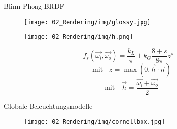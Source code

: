\begin{frame}{\Huge{Blinn-Phong BRDF}}
		
		\begin{figure}
				\centering
				\begin{minipage}{.4\paperwidth}
					\centering
					\texttt{[image: 02\_Rendering/img/glossy.jpg]}
				\end{minipage}%
				\begin{minipage}{.5\paperwidth}
					\centering
					\texttt{[image: 02\_Rendering/img/h.png]}
				\end{minipage}
		\end{figure}
		
    

$$f_{s}(\vec{\omega_{i}}, \vec{\omega_{o}})=\frac{k_{L}}{\pi} + k_{G}\frac{8 + s}{8\pi}z^s$$  $$\mathrm{\quad mit\quad}z=\max(0,\vec{h} \cdot \vec{n})$$
$$\mathrm{\quad mit\quad}\vec{h}=\frac{\vec{\omega_{i}} + \vec{\omega_o}}{2}$$


\end{frame}

\begin{frame}{\Huge{Globale Beleuchtungsmodelle}}
		
		\begin{figure}
				\centering
					\texttt{[image: 02\_Rendering/img/cornellbox.jpg]}
				\centering
		\end{figure}


\end{frame}
